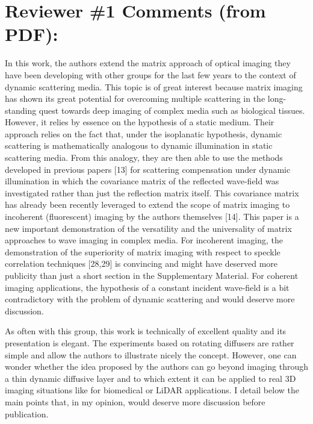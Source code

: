 \documentclass[12pt]{article}
\begin{document}
\section{Reviewer \#1 Comments (from PDF):}

In this work, the authors extend the matrix approach of optical imaging they have been developing with other groups for the last few years to the context of dynamic scattering media. This topic is of great interest because matrix imaging has shown its great potential for overcoming multiple scattering in the long-standing quest towards deep imaging of complex media such as biological tissues. However, it relies by essence on the hypothesis of a static medium. Their approach relies on the fact that, under the isoplanatic hypothesis, dynamic scattering is mathematically analogous to dynamic illumination in static scattering media. From this analogy, they are then able to use the methods developed in previous papers [13] for scattering compensation under dynamic illumination in which the covariance matrix of the reflected wave-field was investigated rather than just the reflection matrix itself. This covariance matrix has already been recently leveraged to extend the scope of matrix imaging to incoherent (fluorescent) imaging by the authors themselves [14]. This paper is a new important demonstration of the versatility and the universality of matrix approaches to wave imaging in complex media. For incoherent imaging, the demonstration of the superiority of matrix imaging with respect to speckle correlation techniques [28,29] is convincing and might have deserved more publicity than just a short section in the Supplementary Material. For coherent imaging applications, the hypothesis of a constant incident wave-field is a bit contradictory with the problem of dynamic scattering and would deserve more discussion.  

As often with this group, this work is technically of excellent quality and its presentation is elegant. The experiments based on rotating diffusers are rather simple and allow the authors to illustrate nicely the concept. However, one can wonder whether the idea proposed by the authors can go beyond imaging through a thin dynamic diffusive layer and to which extent it can be applied to real 3D imaging situations like for biomedical or LiDAR applications. I detail below the main points that, in my opinion, would deserve more discussion before publication.
\end{document}
